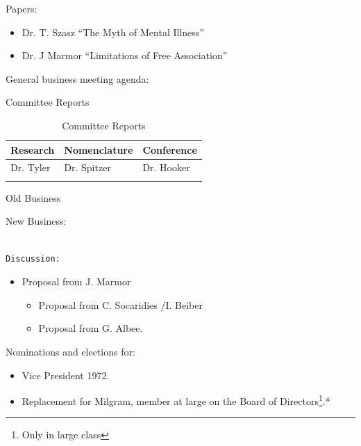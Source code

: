 Papers:

\begin{itemize}
\item Dr. T. Szasz “The Myth of Mental Illness”

\item Dr. J Marmor “Limitations of Free Association”

\end{itemize}

General business meeting agenda:

Committee Reports\\
 \begin{longtable}[!t]{ | p{2cm} | p{2cm} | p{2cm} |   }
\hline

Research&Nomenclature&Conference\\ \hline

Dr. Tyler&
Dr. Spitzer&
Dr. Hooker\\
\caption{Committee Reports}
\label{table: committeeReports}
\end{longtable}

Old Business

New Business:

\begin{adjustwidth}{2.5em}{2.5em}
\begin{verbatim}

Discussion:

\end{verbatim}
\end{adjustwidth}

\begin{itemize}
\item Proposal from J. Marmor

\begin{itemize}
\item Proposal from C. Socaridies \slash  I. Beiber

\item Proposal from G. Albee.

\end{itemize}

\end{itemize}

Nominations and elections for:

\begin{itemize}
\item Vice President 1972.

\item Replacement for Milgram, member at large on the Board of Directors\footnote{Only in large class}.*

\end{itemize}

